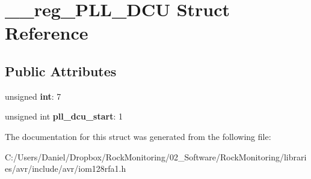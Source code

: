 \hypertarget{struct____reg___p_l_l___d_c_u}{}\section{\+\_\+\+\_\+reg\+\_\+\+P\+L\+L\+\_\+\+D\+CU Struct Reference}
\label{struct____reg___p_l_l___d_c_u}
\subsection*{Public Attributes}
\begin{DoxyCompactItemize}
\item 
unsigned {\bfseries int}\+: 7\hypertarget{struct____reg___p_l_l___d_c_u_a5ec8140abf3393c3ec9c1fb169b8fa0c}{}\label{struct____reg___p_l_l___d_c_u_a5ec8140abf3393c3ec9c1fb169b8fa0c}

\item 
unsigned int {\bfseries pll\+\_\+dcu\+\_\+start}\+: 1\hypertarget{struct____reg___p_l_l___d_c_u_ad7c866f08aadbfb79847ae7824dea350}{}\label{struct____reg___p_l_l___d_c_u_ad7c866f08aadbfb79847ae7824dea350}

\end{DoxyCompactItemize}


The documentation for this struct was generated from the following file\+:\begin{DoxyCompactItemize}
\item 
C\+:/\+Users/\+Daniel/\+Dropbox/\+Rock\+Monitoring/02\+\_\+\+Software/\+Rock\+Monitoring/libraries/avr/include/avr/iom128rfa1.\+h\end{DoxyCompactItemize}
